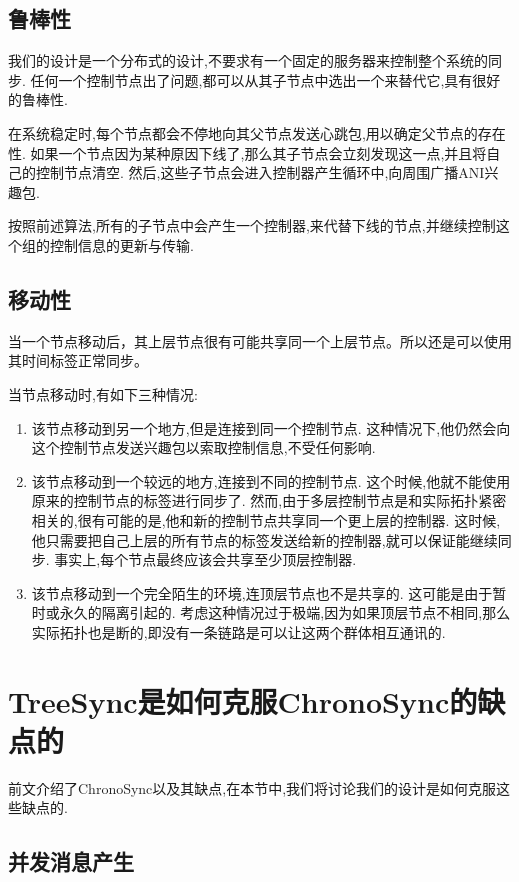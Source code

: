 \subsection{鲁棒性}
我们的设计是一个分布式的设计,不要求有一个固定的服务器来控制整个系统的同步.
任何一个控制节点出了问题,都可以从其子节点中选出一个来替代它,具有很好的鲁棒性.

在系统稳定时,每个节点都会不停地向其父节点发送心跳包,用以确定父节点的存在性.
如果一个节点因为某种原因下线了,那么其子节点会立刻发现这一点,并且将自己的控制节点清空.
然后,这些子节点会进入控制器产生循环中,向周围广播ANI兴趣包.

按照前述算法,所有的子节点中会产生一个控制器,来代替下线的节点,并继续控制这个组的控制信息的更新与传输.

\subsection{移动性}
当一个节点移动后，其上层节点很有可能共享同一个上层节点。所以还是可以使用其时间标签正常同步。

当节点移动时,有如下三种情况:
\begin{enumerate}
  \item 该节点移动到另一个地方,但是连接到同一个控制节点.
  这种情况下,他仍然会向这个控制节点发送兴趣包以索取控制信息,不受任何影响.
  \item 该节点移动到一个较远的地方,连接到不同的控制节点.
  这个时候,他就不能使用原来的控制节点的标签进行同步了.
  然而,由于多层控制节点是和实际拓扑紧密相关的,很有可能的是,他和新的控制节点共享同一个更上层的控制器.
  这时候,他只需要把自己上层的所有节点的标签发送给新的控制器,就可以保证能继续同步.
  事实上,每个节点最终应该会共享至少顶层控制器.
  \item 该节点移动到一个完全陌生的环境,连顶层节点也不是共享的.
  这可能是由于暂时或永久的隔离引起的.
  考虑这种情况过于极端,因为如果顶层节点不相同,那么实际拓扑也是断的,即没有一条链路是可以让这两个群体相互通讯的.
\end{enumerate}

\section{TreeSync是如何克服ChronoSync的缺点的}

前文介绍了ChronoSync以及其缺点,在本节中,我们将讨论我们的设计是如何克服这些缺点的.

\subsection{并发消息产生}

